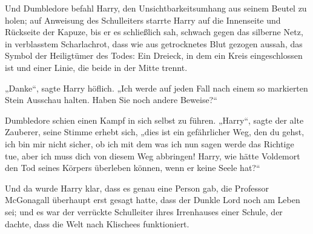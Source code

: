 Und Dumbledore befahl Harry, den Unsichtbarkeitsumhang aus seinem Beutel zu holen; auf Anweisung des Schulleiters starrte Harry auf die Innenseite und Rückseite der Kapuze, bis er es schließlich sah, schwach gegen das silberne Netz, in verblasstem Scharlachrot, dass wie aus getrocknetes Blut gezogen aussah, das Symbol der Heiligtümer des Todes: Ein Dreieck, in dem ein Kreis eingeschlossen ist und einer Linie, die beide in der Mitte trennt.

„Danke“, sagte Harry höflich. „Ich werde auf jeden Fall nach einem so markierten Stein Ausschau halten. Haben Sie noch andere Beweise?“

Dumbledore schien einen Kampf in sich selbst zu führen. „Harry“, sagte der alte Zauberer, seine Stimme erhebt sich, „dies ist ein gefährlicher Weg, den du gehst, ich bin mir nicht sicher, ob ich mit dem was ich nun sagen werde das Richtige tue, aber ich muss dich von diesem Weg abbringen! Harry, wie hätte Voldemort den Tod seines Körpers überleben können, wenn er keine Seele hat?“

Und da wurde Harry klar, dass es genau eine Person gab, die Professor McGonagall überhaupt erst gesagt hatte, dass der Dunkle Lord noch am Leben sei; und es war der verrückte Schulleiter ihres Irrenhauses einer Schule, der dachte, dass die Welt nach Klischees funktioniert.

